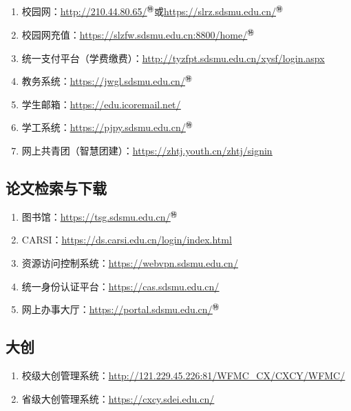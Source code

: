 \subsection[日常使用]{\textbf{}}
\begin{enumerate}
    \item 校园网：\uline{\href{http://210.44.80.65/}{http://210.44.80.65/}$^㊕$}或\uline{\href{https://slrz.sdsmu.edu.cn/}{https://slrz.sdsmu.edu.cn/}$^㊕$}
    \item 校园网充值：\uline{\href{https://slzfw.sdsmu.edu.cn:8800/home/}{https://slzfw.sdsmu.edu.cn:8800/home/}$^㊕$}
    \item 统一支付平台（学费缴费）：\uline{\href{http://tyzfpt.sdsmu.edu.cn/xysf/login.aspx}{http://tyzfpt.sdsmu.edu.cn/xysf/login.aspx}}
    \item 教务系统：\uline{\href{https://jwgl.sdsmu.edu.cn/}{https://jwgl.sdsmu.edu.cn/}$^㊕$}
    \item 学生邮箱：\uline{\href{https://edu.icoremail.net/}{https://edu.icoremail.net/}}
    \item 学工系统：\uline{\href{https://pjpy.sdsmu.edu.cn/}{https://pjpy.sdsmu.edu.cn/}$^㊕$}
    \item 网上共青团（智慧团建）：\uline{\href{https://zhtj.youth.cn/zhtj/signin}{https://zhtj.youth.cn/zhtj/signin}}
\end{enumerate}

\subsection[论文检索与下载]{论文检索与下载}
\begin{enumerate}
    \item 图书馆：\uline{\href{https://tsg.sdsmu.edu.cn/}{https://tsg.sdsmu.edu.cn/}$^㊕$}
    \item CARSI：\uline{\href{https://ds.carsi.edu.cn/login/index.html}{https://ds.carsi.edu.cn/login/index.html}}
    \item 资源访问控制系统：\uline{\href{https://webvpn.sdsmu.edu.cn/}{https://webvpn.sdsmu.edu.cn/}}
    \item 统一身份认证平台：\uline{\href{https://cas.sdsmu.edu.cn/}{https://cas.sdsmu.edu.cn/}}
    \item 网上办事大厅：\uline{\href{https://portal.sdsmu.edu.cn/}{https://portal.sdsmu.edu.cn/}$^㊕$}
\end{enumerate}

\subsection[大创]{大创\footnotemark}
\begin{enumerate}
    \item 校级大创管理系统：\uline{\href{http://121.229.45.226:81/WFMC\_CX/CXCY/WFMC/}{http://121.229.45.226:81/WFMC\_CX/CXCY/WFMC/}}
    \item 省级大创管理系统：\uline{\href{https://cxcy.sdei.edu.cn/}{https://cxcy.sdei.edu.cn/}}
\end{enumerate}

